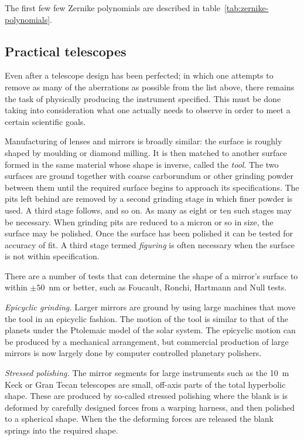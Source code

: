 The first few few Zernike polynomials are described in table~\ref{tab:zernike-polynomials}.

\subsection{Practical telescopes}

Even after a telescope design has been perfected; in which one attempts to 
remove as many of the aberrations as possible from the list above, there 
remains the task of physically producing the instrument specified. This must
be done taking into consideration what one actually needs to observe in 
order to meet a certain scientific goals. 

Manufacturing of lenses and mirrors is broadly similar: the surface is roughly
shaped by moulding or diamond milling. It is then matched to another surface
formed in the same material whose shape is inverse, called the {\it tool}. 
The two surfaces are ground together with coarse carborundum or other grinding
powder between them until the required surface begins to approach 
its specifications. The pits left behind are removed by a second grinding stage
in which finer powder is used. A third stage follows, and so on. As many as
eight or ten such stages may be necessary. When grinding pits are reduced to
a micron or so in size, the surface may be polished. Once the surface has been
polished it can be tested for accuracy of fit. A third stage termed {\it 
figuring} is often necessary when the surface is not within specification. 

There are a number of tests that can determine the shape of a mirror's surface
to within $\pm 50$~nm or better, such as Foucault, Ronchi, Hartmann and Null
tests. 

\noindent
{\it Epicyclic grinding.} Larger mirrors are ground by using large machines that 
move the tool in an epicyclic fashion. The motion of the tool is similar to that of 
the planets under the Ptolemaic model of the solar system. The epicyclic motion 
can be produced by a mechanical arrangement, but commercial production of 
large mirrors is now largely done by computer controlled planetary polishers. 

\noindent
{\it Stressed polishing.} The mirror segments for large instruments such as the 10~m
Keck or Gran Tecan telescopes are small, off-axis parts of the total hyperbolic shape. 
These are produced by so-called stressed polishing where the blank is is deformed 
by carefully designed forces from a warping harness, and then polished to a spherical
shape. When the the deforming forces are released the blank springs into the required 
shape.

